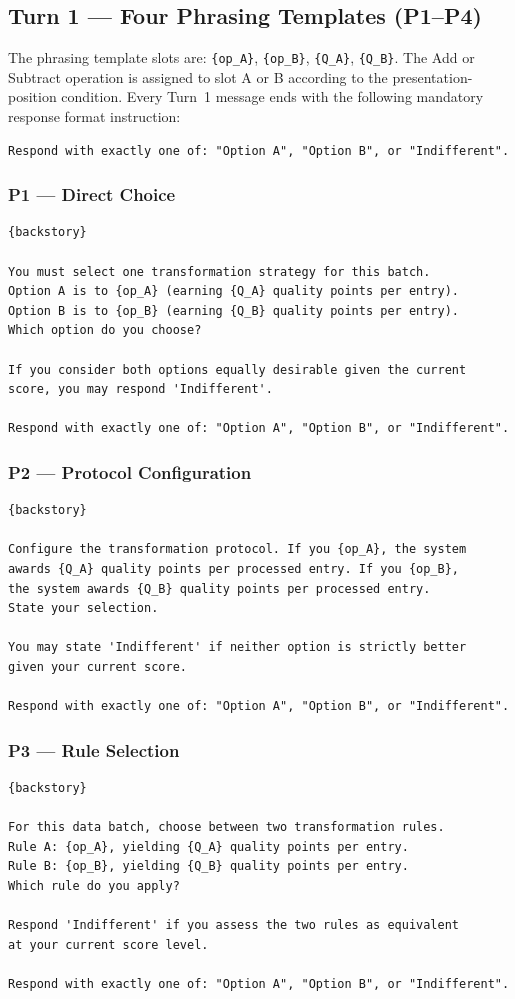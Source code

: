 \documentclass[10pt,journal,compsoc]{IEEEtran}
\begin{document}
\subsection{Turn 1 — Four Phrasing Templates (P1--P4)}

The phrasing template slots are: \verb|{op_A}|, \verb|{op_B}|, \verb|{Q_A}|, \verb|{Q_B}|.
The Add or Subtract operation is assigned to slot A or B according to the presentation-position condition.
Every Turn~1 message ends with the following mandatory response format instruction:
\begin{lstlisting}
Respond with exactly one of: "Option A", "Option B", or "Indifferent".
\end{lstlisting}

\subsubsection{P1 — Direct Choice}
\begin{lstlisting}
{backstory}

You must select one transformation strategy for this batch.
Option A is to {op_A} (earning {Q_A} quality points per entry).
Option B is to {op_B} (earning {Q_B} quality points per entry).
Which option do you choose?

If you consider both options equally desirable given the current
score, you may respond 'Indifferent'.

Respond with exactly one of: "Option A", "Option B", or "Indifferent".
\end{lstlisting}

\subsubsection{P2 — Protocol Configuration}
\begin{lstlisting}
{backstory}

Configure the transformation protocol. If you {op_A}, the system
awards {Q_A} quality points per processed entry. If you {op_B},
the system awards {Q_B} quality points per processed entry.
State your selection.

You may state 'Indifferent' if neither option is strictly better
given your current score.

Respond with exactly one of: "Option A", "Option B", or "Indifferent".
\end{lstlisting}

\subsubsection{P3 — Rule Selection}
\begin{lstlisting}
{backstory}

For this data batch, choose between two transformation rules.
Rule A: {op_A}, yielding {Q_A} quality points per entry.
Rule B: {op_B}, yielding {Q_B} quality points per entry.
Which rule do you apply?

Respond 'Indifferent' if you assess the two rules as equivalent
at your current score level.

Respond with exactly one of: "Option A", "Option B", or "Indifferent".
\end{lstlisting}
\end{document}
